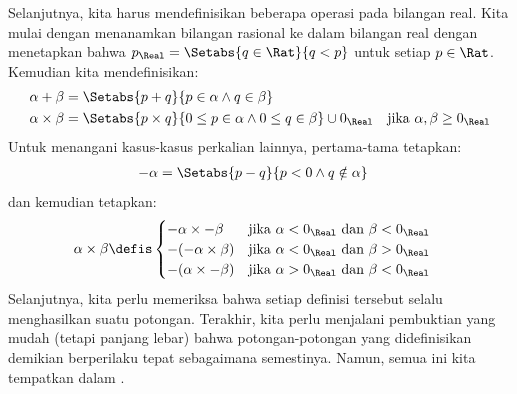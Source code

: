 \documentclass[../../../include/open-logic-section]{subfiles}
\begin{document}
Selanjutnya, kita harus mendefinisikan beberapa operasi pada bilangan real.
Kita mulai dengan menanamkan bilangan rasional ke dalam bilangan real dengan
menetapkan bahwa $p_\Real = \Setabs{q \in \Rat}{q < p}$ untuk setiap $p \in
\Rat$. Kemudian kita mendefinisikan:
\begin{align*}
	\alpha + \beta &= \Setabs{p + q}{p \in \alpha \land q \in \beta}\\
	\alpha \times \beta &=
	\Setabs{p \times q}{0 \leq p \in \alpha \land 0 \leq q \in \beta} \cup 0_\Real & \text{jika }\alpha, \beta \geq 0_\Real
\end{align*}
Untuk menangani kasus-kasus perkalian lainnya, pertama-tama tetapkan: %
\begin{align*}
	-\alpha &= \Setabs{p - q}{p < 0 \land q \notin \alpha}
\end{align*}
dan kemudian tetapkan:
\begin{align*}
	\alpha \times \beta &\defis
	\begin{cases}
		\mathord{-}\alpha \times \mathord{-}\beta &\text{jika }\alpha < 0_\Real\text{ dan }\beta < 0_\Real\\
		\mathord{-}(\mathord{-}\alpha \times \beta) &\text{jika }\alpha < 0_\Real \text{ dan }\beta > 0_\Real\\
		\mathord{-}(\alpha \times \mathord{-}\beta) &\text{jika }\alpha > 0_\Real \text{ dan }\beta < 0_\Real
	\end{cases}
\end{align*}
Selanjutnya, kita perlu memeriksa bahwa setiap definisi tersebut selalu
menghasilkan suatu potongan. Terakhir, kita perlu menjalani pembuktian yang
mudah (tetapi panjang lebar) bahwa potongan-potongan yang didefinisikan
demikian berperilaku tepat sebagaimana semestinya. Namun, semua ini kita
tempatkan dalam .
\end{document}
